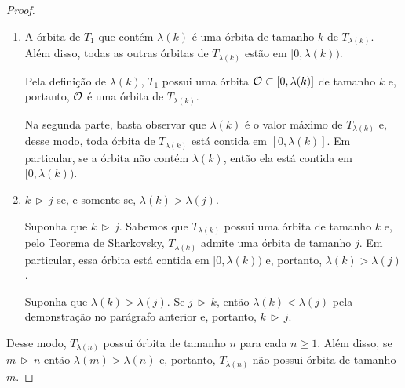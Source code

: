 \begin{proof}
\begin{enumerate}[label=\alph*)]
\item A órbita de $T_1$ que contém $\lambda(k)$ é uma órbita de tamanho $k$ de $T_{\lambda(k)}$.
Além disso, todas as outras órbitas de $T_{\lambda(k)}$ estão em $[0, \lambda(k))$. 

Pela definição de $\lambda(k)$, $T_1$ possui uma órbita $\mathcal{O} \subset [0, \lambda(k)]$ de tamanho $k$ e, portanto, $\mathcal{O}$ é uma órbita de $T_{\lambda(k)}$.

Na segunda parte, basta observar que $\lambda(k)$ é o valor máximo de $T_{\lambda(k)}$ e, desse modo, toda órbita de $T_{\lambda(k)}$ está contida em $[0, \lambda(k)]$.
Em particular, se a órbita não contém $\lambda(k)$, então ela está contida em $[0, \lambda(k))$.

\item $k \, \triangleright \, j$ se, e somente se, $\lambda(k) > \lambda(j)$.

Suponha que $k \, \triangleright \, j$. Sabemos que $T_{\lambda(k)}$ possui uma órbita de tamanho $k$ e, pelo Teorema de Sharkovsky, $T_{\lambda(k)}$ admite uma órbita de tamanho $j$. Em particular, essa órbita está contida em $[0, \lambda(k))$ e, portanto, $\lambda(k) > \lambda(j)$.

Suponha que $\lambda(k) > \lambda(j)$. Se $j \, \triangleright \, k$, então $\lambda(k) < \lambda(j)$ pela demonstração no parágrafo anterior e, portanto, $k \, \triangleright \, j$.
\end{enumerate}

Desse modo, $T_{\lambda(n)}$ possui órbita de tamanho $n$ para cada $n \geq 1$. Além disso, se $m \, \triangleright \, n$ então $\lambda(m) > \lambda(n)$ e, portanto, $T_{\lambda(n)}$ não possui órbita de tamanho $m$.
\end{proof}
